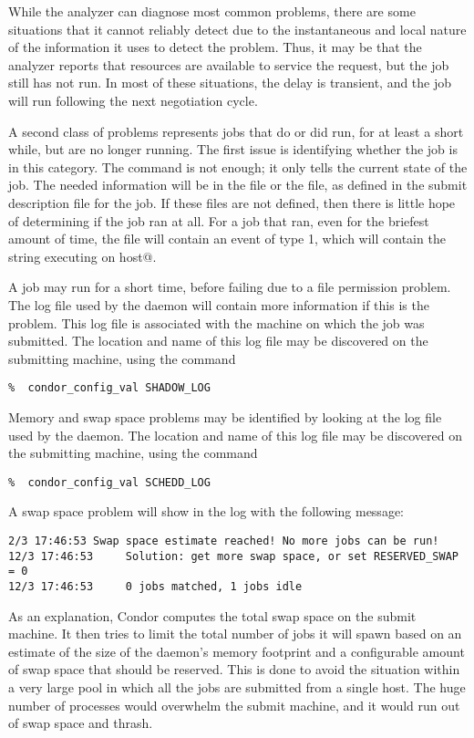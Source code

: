 While the analyzer can diagnose most common problems, there are some situations
that it cannot reliably detect due to the instantaneous and local nature of the
information it uses to detect the problem.  Thus, it may be that the analyzer
reports that resources are available to service the request, but the job still 
has not run.  In most of these situations, the delay is transient, and the
job will run following the next negotiation cycle.

A second class of problems represents jobs that do or did run,
for at least a short while, but are no longer running.
The first issue is identifying whether the job is in this category.
The  command is not enough; it only tells the
current state of the job.
The needed information will be in the  file 
or the  file, as defined in the submit description file
for the job.
If these files are not defined, then there is little hope of
determining if the job ran at all.
For a job that ran, even for the briefest amount of time,
the  file will contain an event of type 1,
which will contain the string
\verb@Job executing on host@.

A job may run for a short time, before failing due to a file permission
problem.
The log file used by the  daemon will contain more information
if this is the problem.
This log file is associated with the machine on which the job was submitted.
The location and name of this log file may be discovered on the
submitting machine, using the command
\footnotesize
\begin{verbatim}
%  condor_config_val SHADOW_LOG
\end{verbatim}
\normalsize

Memory and swap space problems may be identified by looking at the log
file used by the  daemon.
The location and name of this log file may be discovered on the
submitting machine, using the command
\footnotesize
\begin{verbatim}
%  condor_config_val SCHEDD_LOG
\end{verbatim}
\normalsize
A swap space problem will show in the log with the following message:
\footnotesize
\begin{verbatim}
2/3 17:46:53 Swap space estimate reached! No more jobs can be run!
12/3 17:46:53     Solution: get more swap space, or set RESERVED_SWAP = 0
12/3 17:46:53     0 jobs matched, 1 jobs idle
\end{verbatim}
\normalsize
As an explanation,
Condor computes the total swap space on the submit machine.
It then tries to limit the total number of jobs it
will spawn based on an estimate of the size of the 
daemon's memory footprint and a configurable amount of swap space
that should be reserved.
This is done to avoid the
situation within a very large pool
in which all the jobs are submitted from a single host.
The huge number of  processes would
overwhelm the submit machine,
and it would run out of swap space and thrash.

